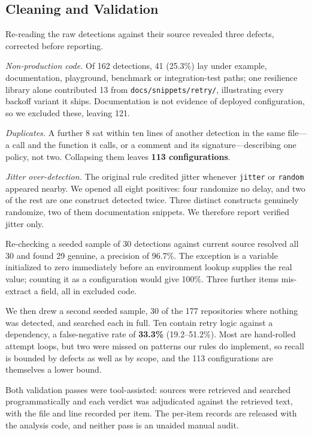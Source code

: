 \documentclass[conference]{IEEEtran}
\begin{document}
\subsection{Cleaning and Validation}

Re-reading the raw detections against their source revealed three defects, corrected before reporting.

\textit{Non-production code.} Of 162 detections, 41 (25.3\%) lay under example, documentation, playground, benchmark or integration-test paths; one resilience library alone contributed 13 from \texttt{docs/snippets/retry/}, illustrating every backoff variant it ships. Documentation is not evidence of deployed configuration, so we excluded these, leaving 121.

\textit{Duplicates.} A further 8 sat within ten lines of another detection in the same file---a call and the function it calls, or a comment and its signature---describing one policy, not two. Collapsing them leaves \textbf{113 configurations}.

\textit{Jitter over-detection.} The original rule credited jitter whenever \texttt{jitter} or \texttt{random} appeared nearby. We opened all eight positives: four randomize no delay, and two of the rest are one construct detected twice. Three distinct constructs genuinely randomize, two of them documentation snippets. We therefore report verified jitter only.

Re-checking a seeded sample of 30 detections against current source resolved all 30 and found 29 genuine, a precision of 96.7\%. The exception is a variable initialized to zero immediately before an environment lookup supplies the real value; counting it as a configuration would give 100\%. Three further items mis-extract a field, all in excluded code.

We then drew a second seeded sample, 30 of the 177 repositories where nothing was detected, and searched each in full. Ten contain retry logic against a dependency, a false-negative rate of \textbf{33.3\%} (19.2--51.2\%). Most are hand-rolled attempt loops, but two were missed on patterns our rules do implement, so recall is bounded by defects as well as by scope, and the 113 configurations are themselves a lower bound.

Both validation passes were tool-assisted: sources were retrieved and searched programmatically and each verdict was adjudicated against the retrieved text, with the file and line recorded per item. The per-item records are released with the analysis code, and neither pass is an unaided manual audit.
\end{document}
